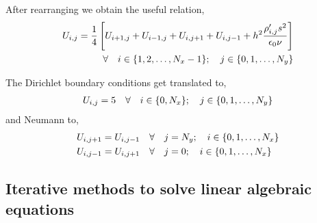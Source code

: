After rearranging we obtain the useful relation,
\begin{align} \label{eq:difference equation}
    U_{i,j} = \frac{1}{4} \left[ U_{i+1,j}+ U_{i-1,j} + U_{i,j+1}+ U_{i,j-1} + h^2\frac{\rho'_{i,j} s^2}{\epsilon_0 \nu} \right] \\ \hspace{0.35cm} \forall \hspace{0.35cm} i \in \{1,2,\dots,N_x-1\} ; \hspace{0.35cm} j \in \{0,1,\dots,N_y\} 
\end{align}

The Dirichlet boundary conditions get translated to,
\begin{align*}
    U_{i,j} = 5 \hspace{0.35cm} \forall \hspace{0.35cm} i \in \{0,N_x\} ; \hspace{0.35cm} j \in \{0,1,\dots,N_y\}
\end{align*}
and Neumann to,
\begin{align*}
    &U_{i,j+1} = U_{i,j-1} \hspace{0.35cm} \forall \hspace{0.35cm} j = N_y ; \hspace{0.35cm} i \in \{0,1,\dots,N_x\} \\
    &U_{i,j-1} = U_{i,j+1} \hspace{0.35cm} \forall \hspace{0.35cm} j = 0 ; \hspace{0.35cm} i \in \{0,1,\dots,N_x\} 
\end{align*}
\subsection{Iterative methods to solve linear algebraic equations}

